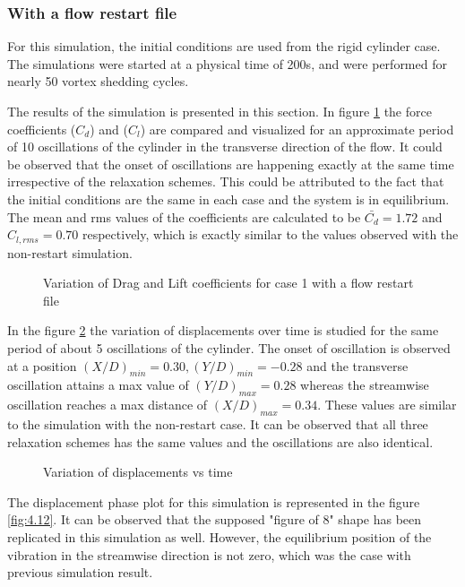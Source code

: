\subsubsection{With a flow restart file}
For this simulation, the initial conditions are used from the rigid cylinder case. The simulations were started at a physical time of 200s, and were performed for nearly 50 vortex shedding cycles. 

The results of the simulation is presented in this section. In figure \ref{fig:4.10} the force coefficients ($C_d$) and ($C_l$) are compared and visualized for an approximate period of 10 oscillations of the cylinder in the transverse direction of the flow. It could be observed that the onset of oscillations are happening exactly at the same time irrespective of the relaxation schemes. This could be attributed to the fact that the initial conditions are the same in each case and the system is in equilibrium. The mean and rms values of the coefficients are calculated to be $\bar{C_d} = 1.72$ and $C_{l,rms} = 0.70$ respectively, which is exactly similar to the values observed with the non-restart simulation.

\begin{figure}[H]
\centering
\fbox{\texttt{[image: FC\_Sg1\_wr]}}
\caption{Variation of Drag and Lift coefficients for case 1 with a flow restart file}
\label{fig:4.10}
\end{figure}

In the figure \ref{fig:4.11} the variation of displacements over time is studied for the same period of about 5 oscillations of the cylinder. The onset of oscillation is observed at a position $(X/D)_{min}=0.30, (Y/D)_{min}=-0.28$ and the transverse oscillation attains a max value of $(Y/D)_{max}=0.28$ whereas the streamwise oscillation reaches a max distance of $(X/D)_{max}=0.34$. These values are similar to the simulation with the non-restart case. It can be observed that all three relaxation schemes has the same values and the oscillations are also identical.

\begin{figure}[H]
\centering
\fbox{\texttt{[image: DC\_Sg1\_wr]}}
\caption{Variation of displacements vs time}
\label{fig:4.11}
\end{figure}

The displacement phase plot for this simulation is represented in the figure \ref{fig:4.12}. It can be observed that the supposed "figure of 8" shape has been replicated in this simulation as well. However, the equilibrium position of the vibration in the streamwise direction is not zero, which was the case with previous simulation result. 

